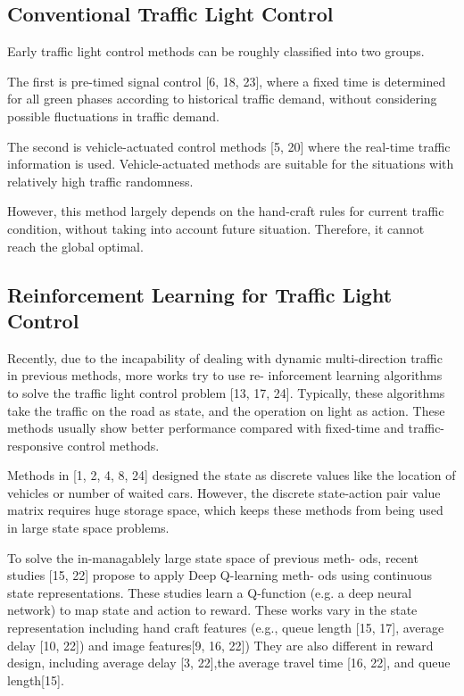 \documentclass{article}
\begin{document}
\subsection{Conventional Traffic Light Control}
\quad Early traffic light control methods can be roughly classified into
two groups. 

The first is pre-timed signal control [6, 18, 23], where a fixed time is determined for all green phases according to historical traffic demand, without considering possible fluctuations in traffic demand. 

The second is vehicle-actuated control methods [5, 20] where the real-time traffic information is used. Vehicle-actuated methods are suitable for the situations with relatively high traffic randomness. 

However, this method largely depends on the hand-craft rules for current traffic condition, without taking into account future situation. Therefore, it cannot reach the global optimal.

\subsection{Reinforcement Learning for Traffic Light Control}
\quad Recently, due to the incapability of dealing with dynamic multi-direction traffic in previous methods, more works try to use re-
inforcement learning algorithms to solve the traffic light control problem [13, 17, 24]. Typically, these algorithms take the traffic on
the road as state, and the operation on light as action. These methods usually show better performance compared with fixed-time
and traffic-responsive control methods.

Methods in [1, 2, 4, 8, 24] designed the state as discrete values like the location of vehicles or number of waited cars. However,
the discrete state-action pair value matrix requires huge storage
space, which keeps these methods from being used in large state
space problems.

To solve the in-managablely large state space of previous meth-
ods, recent studies [15, 22] propose to apply Deep Q-learning meth-
ods using continuous state representations. These studies learn a
Q-function (e.g. a deep neural network) to map state and action to
reward. These works vary in the state representation including hand
craft features (e.g., queue length [15, 17], average delay [10, 22]) and
image features[9, 16, 22]) They are also different in reward design,
including average delay [3, 22],the average travel time [16, 22], and
queue length[15].
\end{document}

